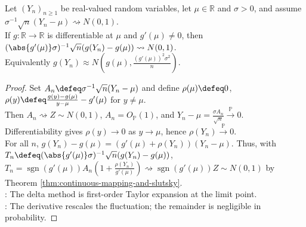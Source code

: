 \begin{theorem} \label{thm:delta-method-univariate} \\
Let $(Y_n)_{n\geq1}$ be real-valued random variables, let $\mu\in\mathbb{R}$ and $\sigma>0$, and assume $\sigma^{-1}\sqrt{n}(Y_n-\mu)\rightsquigarrow N(0,1)$.\\
If $g:\mathbb{R}\to\mathbb{R}$ is differentiable at $\mu$ and $g'(\mu)\neq0$, then $(\abs{g'(\mu)}\sigma)^{-1}\sqrt{n}(g(Y_n)-g(\mu))\rightsquigarrow N(0,1)$.\\
Equivalently $g(Y_n)\approx N(g(\mu),\frac{(g'(\mu))^2\sigma^2}{n})$.
\begin{proof} Set $A_n\defeq\sigma^{-1}\sqrt{n}(Y_n-\mu)$ and define $\rho(\mu)\defeq0$, $\rho(y)\defeq\frac{g(y)-g(\mu)}{y-\mu}-g'(\mu)$ for $y\neq\mu$.\\
Then $A_n\rightsquigarrow Z\sim N(0,1)$, $A_n=O_{\mathbb{P}}(1)$, and $Y_n-\mu=\frac{\sigma A_n}{\sqrt{n}}\xrightarrow{\mathbb{P}}0$.\\
Differentiability gives $\rho(y)\to0$ as $y\to\mu$, hence $\rho(Y_n)\xrightarrow{\mathbb{P}}0$.\\
For all $n$, $g(Y_n)-g(\mu)=(g'(\mu)+\rho(Y_n))(Y_n-\mu)$. Thus, with $T_n\defeq(\abs{g'(\mu)}\sigma)^{-1}\sqrt{n}(g(Y_n)-g(\mu))$,\\
$T_n=\operatorname{sgn}(g'(\mu))A_n(1+\frac{\rho(Y_n)}{g'(\mu)})\rightsquigarrow \operatorname{sgn}(g'(\mu))Z\sim N(0,1)$ by Theorem \ref{thm:continuous-mapping-and-slutsky}.\\
: The delta method is first-order Taylor expansion at the limit point.\\
: The derivative rescales the fluctuation; the remainder is negligible in probability.
\end{proof}
\end{theorem}

